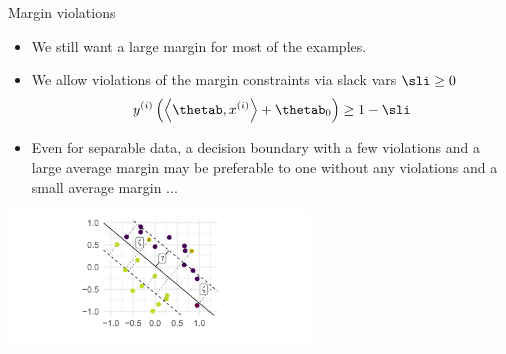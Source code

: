 \begin{vbframe}{Margin violations}

  \begin{itemize}
    \item We still want a large margin for most of the examples.
    \item We allow violations of the margin constraints via slack vars $\sli \geq 0$
    $$
    \yi \left( \scp{\thetab}{\xi} + \thetab_0 \right) \geq 1 - \sli
    $$
    \item Even for separable data, a decision boundary with a few violations and a large average margin may be preferable to one without any violations and a small average margin ...
\end{itemize}


\begin{center}
\includegraphics[width = 8cm ]{figure_man/boundary.png} \\
\end{center}

\end{vbframe}

